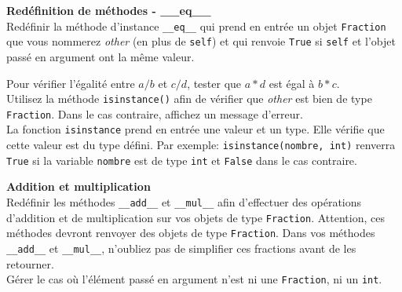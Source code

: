 \begin{Exercice}[15 minutes] \textbf{Redéfinition de méthodes - \_\_eq\_\_}\\
	Redéfinir la méthode d'instance \lstinline{__eq__} qui prend en entrée un objet \lstinline{Fraction} que vous nommerez \textit{other} (en plus de \lstinline{self}) et qui renvoie \lstinline{True} si \lstinline{self} et l'objet passé en argument ont la même valeur.
	\begin{conseil}
		Pour vérifier l'égalité entre $a/b$ et $c/d$, tester que $a*d$ est égal à $b*c$. \\
		Utilisez la méthode \lstinline{isinstance()} afin de vérifier que \textit{other} est bien de type \lstinline{Fraction}. Dans le cas contraire, affichez un message d'erreur.
		\\La fonction \lstinline{isinstance} prend en entrée une valeur et un type. Elle vérifie que cette valeur est du type défini. Par exemple: \lstinline{isinstance(nombre, int)} renverra \lstinline{True} si la variable \lstinline{nombre} est de type \lstinline{int} et \lstinline{False} dans le cas contraire.
	\end{conseil}
\end{Exercice}

\begin{Exercice}[15 minutes] \textbf{Addition et multiplication}\\
	Redéfinir les méthodes \lstinline{__add__} et \lstinline{__mul__} afin d'effectuer des opérations d'addition et de multiplication sur vos objets de type \lstinline{Fraction}. Attention, ces méthodes devront renvoyer des objets de type \lstinline{Fraction}. Dans vos méthodes \lstinline{__add__} et \lstinline{__mul__}, n'oubliez pas de simplifier ces fractions avant de les retourner.\\
	Gérer le cas où l'élément passé en argument n'est ni une \lstinline{Fraction}, ni un \lstinline{int}.
\end{Exercice}

\begin{solution}
	
\end{solution}

\begin{solution}
	
\end{solution}

\begin{solution}
	
\end{solution}

